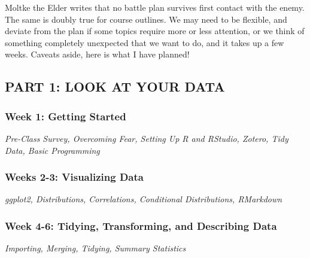 \documentclass[11pt, letterpaper]{article}
\begin{document}
Moltke the Elder writes that no battle plan survives first contact with the enemy. The same is doubly true for course outlines. We may need to be flexible, and deviate from the plan if some topics require more or less attention, or we think of something completely unexpected that we want to do, and it takes up a few weeks. Caveats aside, here is what I have planned! %

\subsection*{PART 1: LOOK AT YOUR DATA}

\subsubsection*{Week 1: Getting Started}
\textit{Pre-Class Survey, Overcoming Fear, Setting Up R and RStudio, Zotero, Tidy Data, Basic Programming}

\subsubsection*{Weeks 2-3: Visualizing Data}
\textit{ggplot2, Distributions, Correlations, Conditional Distributions, RMarkdown}



\subsubsection*{Week 4-6: Tidying, Transforming, and Describing Data}
\textit{Importing, Merging, Tidying, Summary Statistics}
\end{document}
